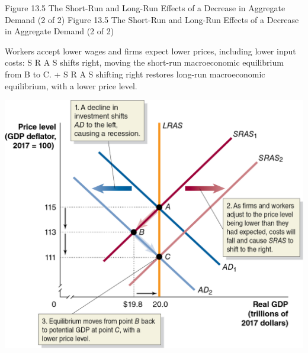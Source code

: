 \documentclass[
  12pt,
  ignorenonframetext,
]{beamer}
\begin{document}
\begin{frame}{Figure 13.5 The Short-Run and Long-Run Effects of a
Decrease in Aggregate Demand (2 of 2)}
\protect\hypertarget{figure-13.5-the-short-run-and-long-run-effects-of-a-decrease-in-aggregate-demand-2-of-2}{}
Figure 13.5 The Short-Run and Long-Run Effects of a Decrease in
Aggregate Demand (2 of 2)

Workers accept lower wages and firms expect lower prices, including
lower input costs: S R A S shifts right, moving the short-run
macroeconomic equilibrium from B to C. + S R A S shifting right restores
long-run macroeconomic equilibrium, with a lower price level.

\includegraphics[width=\textwidth,height=0.99\textheight]{imgs3/img_slide33a.png}
\end{frame}
\end{document}
